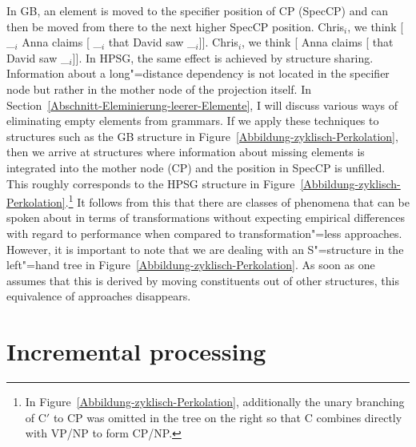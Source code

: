 In GB, an element is moved to the specifier position of CP (SpecCP) and can then be moved from there to the next higher SpecCP position.
\eal\settowidth{}
\ex
Chris$_i$, we think [ \_$_i$ Anna claims [ \_$_i$ that David saw \_$_i$]].
\ex
Chris$_i$, we think [ Anna claims [ that David saw \_$_i$]].
\zl
In HPSG, the same effect is achieved by structure sharing. Information about a long"=distance dependency
is not located in the specifier node but rather in the mother node of the projection itself. In Section~\ref{Abschnitt-Eleminierung-leerer-Elemente},
I will discuss various ways of eliminating empty elements from grammars. If we apply these techniques to structures such as the GB structure
in Figure~\ref{Abbildung-zyklisch-Perkolation}, then we arrive at structures where information about missing elements is integrated into the
mother node (CP) and the position in SpecCP is unfilled. This roughly corresponds to the HPSG structure in Figure~\ref{Abbildung-zyklisch-Perkolation}.\footnote{%
In Figure~\ref{Abbildung-zyklisch-Perkolation}, additionally the unary branching of C$'$ to CP was omitted in the tree on the right so that C combines directly with VP/NP
to form CP/NP.%
}
It follows from this that there are classes of phenomena that
can be spoken about in terms of transformations without expecting empirical differences with regard to
performance when compared to transformation"=less approaches.
However, it is important to note that we are dealing with an S"=structure in the left"=hand tree in Figure~\ref{Abbildung-zyklisch-Perkolation}. As soon as one assumes
that this is derived by moving constituents out of other structures, this equivalence of approaches disappears.

\section{Incremental processing}
\label{Abschnitt-Inkrementelle-Verarbeitung}

